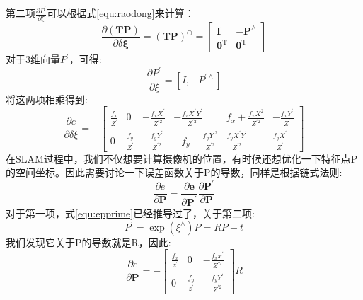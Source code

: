第二项$\frac{\partial P^{\prime}}{\partial \xi}$可以根据式\ref{equ:raodong}来计算：
\begin{equation}
\frac{\partial(\boldsymbol{T} \boldsymbol{P})}{\partial \delta \boldsymbol{\xi}}=(\boldsymbol{T} \boldsymbol{P})^{\odot}=\left[ \begin{array}{cc}{\boldsymbol{I}} & {-\boldsymbol{P}}^{\wedge} \\ {\mathbf{0}^{\mathrm{T}}} & {\mathbf{0}^{\mathrm{T}}}\end{array}\right]
\end{equation}
对于3维向量$P^{\prime}$，可得:
\begin{equation}
\frac{\partial P^{\prime}}{\partial \xi}=\left[I,-P^{\prime \wedge}\right]
\end{equation}
将这两项相乘得到:
\begin{equation}
\frac{\partial e}{\partial \delta \xi}=-\left[ \begin{array}{cccccc}{\frac{f_{x}}{Z^{\prime}}} & {0} & {-\frac{f_{x} X^{\prime}}{Z^{\prime 2}}} & {-\frac{f_{x} X^{\prime} Y^{\prime}}{Z^{\prime 2}}} & {f_{x}+\frac{f_{x} X^{2}}{Z^{\prime 2}}} & {-\frac{f_{x} Y^{\prime}}{Z^{\prime}}} \\ {0} & {\frac{f_{y}}{Z^{\prime}}} & {-\frac{f_{y} Y^{\prime}}{Z^{\prime 2}}} & {-f_{y}-\frac{f_{y} Y^{\prime 2}}{Z^{\prime 2}}} & {\frac{f_{y} X^{\prime} Y^{\prime}}{Z^{\prime 2}}} & {\frac{f_{y} X^{\prime}}{Z^{\prime}}}\end{array}\right]
\end{equation}
在SLAM过程中，我们不仅想要计算摄像机的位置，有时候还想优化一下特征点P的空间坐标。因此需要讨论一下误差函数关于P的导数，同样是根据链式法则:
\begin{equation}
\frac{\partial e}{\partial \boldsymbol{P}}=\frac{\partial \boldsymbol{e}}{\partial \boldsymbol{P}^{\prime}} \frac{\partial \boldsymbol{P}^{\prime}}{\partial \boldsymbol{P}}
\end{equation}
对于第一项，式\ref{equ:epprime}已经推导过了，关于第二项:
\begin{equation}
P^{\prime}=\exp \left(\xi^{\wedge}\right) P=R P+t
\end{equation}
我们发现它关于P的导数就是R，因此:
\begin{equation}
\frac{\partial e}{\partial \boldsymbol{P}}
=-\left[ \begin{array}{ccc}{\frac{f_{x}}{z^{\prime}}} & {0} & {-\frac{f_{x} x^{\prime}}{Z^{\prime 2}}} \\ {0} & {\frac{f_{y}}{z^{\prime}}} & {-\frac{f_{y} Y^{\prime}}{Z^{\prime 2}}}\end{array}\right] R
\end{equation}
